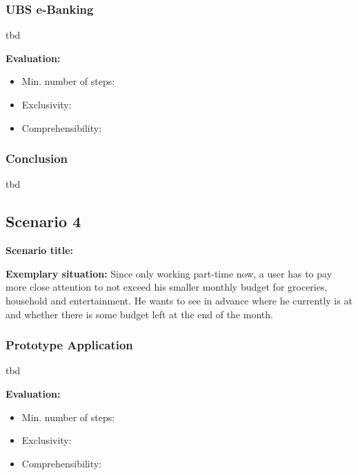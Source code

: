 
\subsubsection{UBS e-Banking}

tbd

\textbf{Evaluation:} 
\begin{itemize}[noitemsep,nolistsep]
	\item Min. number of steps: \textbf{}
	\item Exclusivity: \textbf{}
	\item Comprehensibility: \textbf{}
\end{itemize}


\subsubsection{Conclusion}

tbd





\subsection{Scenario 4}

\textbf{Scenario title:} \scenfour

\textbf{Exemplary situation:} Since only working part-time now, a user has to pay more close attention to not exceed his smaller monthly budget for groceries, household and entertainment. He wants to see in advance where he currently is at and whether there is some budget left at the end of the month.



\subsubsection{Prototype Application}

tbd

\textbf{Evaluation:} 
\begin{itemize}[noitemsep,nolistsep]
	\item Min. number of steps: \textbf{}
	\item Exclusivity: \textbf{}
	\item Comprehensibility: \textbf{}
\end{itemize}



